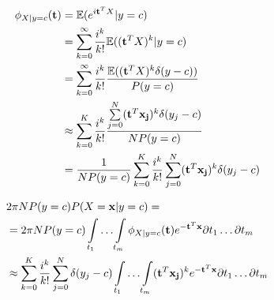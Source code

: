 \documentclass{article}
\begin{document}
\begin{equation}
\label{cf_exgiveny}
\begin{align}
\phi_{X|y=c}(\bold{t}) &= \mathbb{E}(e^{i\bold{t}^T X}|y=c)\\
&= \sum\limits_{k=0}^{\infty}\frac{i^k}{k!}\mathbb{E}((\bold{t}^T X)^k|y=c)\\
&= \sum\limits_{k=0}^{\infty}\frac{i^k}{k!}\frac{\mathbb{E}((\bold{t}^T X)^k\delta(y-c))}{P(y=c)}\\
&\approx \sum\limits_{k=0}^{K}\frac{i^k}{k!}\frac{\sum\limits_{j=0}^{N}(\bold{t}^T \bold{x_j})^k\delta(y_j-c)}{NP(y=c)}\\
&= \frac{1}{NP(y=c)}\sum\limits_{k=0}^{K}\frac{i^k}{k!}\sum\limits_{j=0}^{N}(\bold{t}^T \bold{x_j})^k\delta(y_j-c)
\end{align}
\end{equation}

\begin{equation}
\label{pxgiveny}
\begin{align}
&2\pi NP(y=c)P(X=\bold{x}|y=c) =\\
&= 2\pi NP(y=c)\int\limits_{t_1}\ldots\int\limits_{t_m}\phi_{X|y=c}(\bold{t})e^{-\bold{t}^{T}\bold{x}}\partial t_1\ldots \partial t_m\\
&\approx\sum\limits_{k=0}^{K}\frac{i^k}{k!}\sum\limits_{j=0}^{N}\delta(y_j-c)\int\limits_{t_1}\ldots\int\limits_{t_m}(\bold{t}^T \bold{x_j})^k e^{-\bold{t}^{T}\bold{x}} \partial t_1\ldots \partial t_m
\end{align}
\end{equation}




\end{document}
